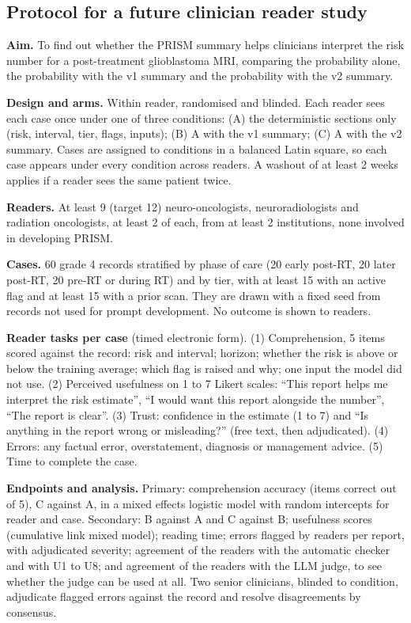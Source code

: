 \documentclass[11pt,a4paper]{article}
\begin{document}
\subsection{Protocol for a future clinician reader study}\label{sec:S21.1}

\textbf{Aim.} To find out whether the PRISM summary helps clinicians interpret the risk number for a post-treatment
glioblastoma MRI, comparing the probability alone, the probability with the v1 summary and the probability with the
v2 summary.

\textbf{Design and arms.} Within reader, randomised and blinded. Each reader sees each case once under one of three
conditions: (A) the deterministic sections only (risk, interval, tier, flags, inputs); (B) A with the v1 summary; (C)
A with the v2 summary. Cases are assigned to conditions in a balanced Latin square, so each case appears under every
condition across readers. A washout of at least 2 weeks applies if a reader sees the same patient twice.

\textbf{Readers.} At least 9 (target 12) neuro-oncologists, neuroradiologists and radiation oncologists, at least 2
of each, from at least 2 institutions, none involved in developing PRISM.

\textbf{Cases.} 60 grade 4 records stratified by phase of care (20 early post-RT, 20 later post-RT, 20 pre-RT or
during RT) and by tier, with at least 15 with an active flag and at least 15 with a prior scan. They are drawn with a
fixed seed from records not used for prompt development. No outcome is shown to readers.

\textbf{Reader tasks per case} (timed electronic form). (1) Comprehension, 5 items scored against the record: risk and
interval; horizon; whether the risk is above or below the training average; which flag is raised and why; one input
the model did not use. (2) Perceived usefulness on 1 to 7 Likert scales: ``This report helps me interpret the risk
estimate'', ``I would want this report alongside the number'', ``The report is clear''. (3) Trust: confidence in the
estimate (1 to 7) and ``Is anything in the report wrong or misleading?'' (free text, then adjudicated). (4) Errors:
any factual error, overstatement, diagnosis or management advice. (5) Time to complete the case.

\textbf{Endpoints and analysis.} Primary: comprehension accuracy (items correct out of 5), C against A, in a mixed
effects logistic model with random intercepts for reader and case. Secondary: B against A and C against B; usefulness
scores (cumulative link mixed model); reading time; errors flagged by readers per report, with adjudicated severity;
agreement of the readers with the automatic checker and with U1 to U8; and agreement of the readers with the LLM judge,
to see whether the judge can be used at all. Two senior clinicians, blinded to condition, adjudicate flagged errors
against the record and resolve disagreements by consensus.
\end{document}
